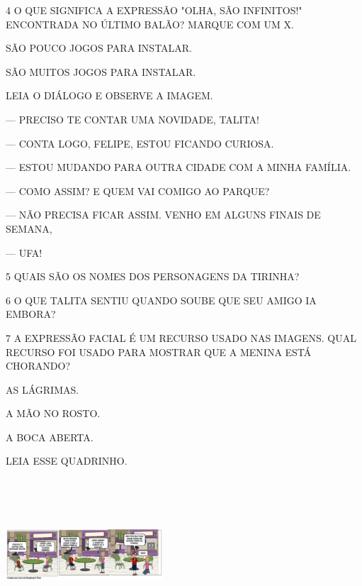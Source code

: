 \num{4} O QUE SIGNIFICA A EXPRESSÃO "OLHA, SÃO INFINITOS!" ENCONTRADA NO ÚLTIMO BALÃO? MARQUE COM UM X.

\begin{boxlist}
\boxitem[] SÃO POUCO JOGOS PARA INSTALAR.

\boxitem[{\rosa{X}}] SÃO MUITOS JOGOS PARA INSTALAR.
\end{boxlist}

LEIA O DIÁLOGO E OBSERVE A IMAGEM.




— PRECISO TE CONTAR UMA NOVIDADE, TALITA!

— CONTA LOGO, FELIPE, ESTOU FICANDO CURIOSA.

— ESTOU MUDANDO PARA OUTRA CIDADE COM A MINHA FAMÍLIA.

— COMO ASSIM? E QUEM VAI COMIGO AO PARQUE?

— NÃO PRECISA FICAR ASSIM. VENHO EM ALGUNS FINAIS DE SEMANA,

— UFA!


\num{5} QUAIS SÃO OS NOMES DOS PERSONAGENS DA TIRINHA?


\num{6} O QUE TALITA SENTIU QUANDO SOUBE QUE SEU AMIGO IA EMBORA?


\num{7} A EXPRESSÃO FACIAL É UM RECURSO USADO NAS IMAGENS. QUAL RECURSO FOI USADO PARA MOSTRAR QUE A MENINA ESTÁ CHORANDO?

\begin{boxlist}
\boxitem[{\rosa{X}}] AS LÁGRIMAS.

\boxitem[] A MÃO NO ROSTO.

\boxitem[] A BOCA ABERTA.
\end{boxlist}

LEIA ESSE QUADRINHO.

\includegraphics[width=2.31319in,height=2.23333in]{media/image175.png}

